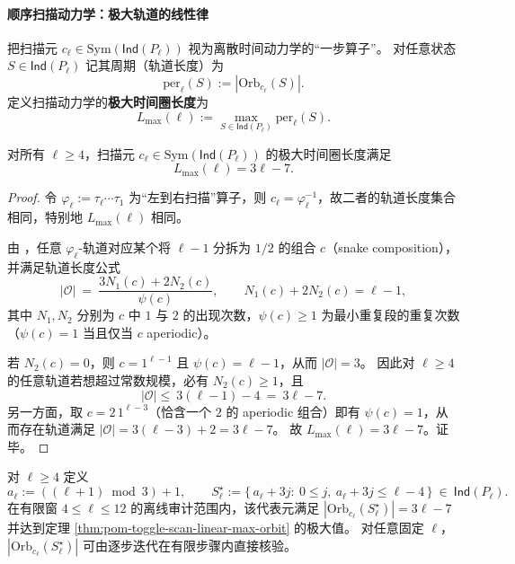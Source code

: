 \paragraph{顺序扫描动力学：极大轨道的线性律}

\begin{definition}[极大时间圈长度]\label{def:pom-toggle-scan-max-orbit}
把扫描元 \(c_\ell\in\mathrm{Sym}(\mathsf{Ind}(P_\ell))\) 视为离散时间动力学的“一步算子”。
对任意状态 \(S\in\mathsf{Ind}(P_\ell)\) 记其周期（轨道长度）为
\[
\mathrm{per}_\ell(S):=|\mathrm{Orb}_{c_\ell}(S)|.
\]
定义扫描动力学的\textbf{极大时间圈长度}为
\[
L_{\max}(\ell):=\max_{S\in\mathsf{Ind}(P_\ell)} \mathrm{per}_\ell(S).
\]
\end{definition}

\begin{theorem}\label{thm:pom-toggle-scan-linear-max-orbit}
对所有 \(\ell\ge 4\)，扫描元 \(c_\ell\in\mathrm{Sym}(\mathsf{Ind}(P_\ell))\) 的极大时间圈长度满足
\[
L_{\max}(\ell)=3\ell-7.
\]
\end{theorem}
\begin{proof}
令 \(\varphi_\ell:=\tau_\ell\cdots\tau_1\) 为“左到右扫描”算子，则 \(c_\ell=\varphi_\ell^{-1}\)，故二者的轨道长度集合相同，特别地 \(L_{\max}(\ell)\) 相同。

由 \cite[Def.~4.1 \& Prop.~4.3]{JosephRoby2018TogglingIndependentSetsPath}，任意 \(\varphi_\ell\)-轨道对应某个将 \(\ell-1\) 分拆为 \(1/2\) 的组合 \(c\)（snake composition），并满足轨道长度公式
\[
|\mathcal O|
\ =\
\frac{3N_1(c)+2N_2(c)}{\psi(c)},
\qquad
N_1(c)+2N_2(c)=\ell-1,
\]
其中 \(N_1,N_2\) 分别为 \(c\) 中 \(1\) 与 \(2\) 的出现次数，\(\psi(c)\ge 1\) 为最小重复段的重复次数（\(\psi(c)=1\) 当且仅当 \(c\) aperiodic）。

若 \(N_2(c)=0\)，则 \(c=1^{\ell-1}\) 且 \(\psi(c)=\ell-1\)，从而 \(|\mathcal O|=3\)。
因此对 \(\ell\ge 4\) 的任意轨道若想超过常数规模，必有 \(N_2(c)\ge 1\)，且
\[
|\mathcal O|
\le\
3(\ell-1)-4
\ =\
3\ell-7.
\]
另一方面，取 \(c=2\,1^{\ell-3}\)（恰含一个 \(2\) 的 aperiodic 组合）即有 \(\psi(c)=1\)，从而存在轨道满足
\(
|\mathcal O|=3(\ell-3)+2=3\ell-7
\)。
故 \(L_{\max}(\ell)=3\ell-7\)。证毕。
\end{proof}

\begin{remark}\label{rem:pom-toggle-scan-explicit-long-orbit}
对 \(\ell\ge 4\) 定义
\[
a_\ell:=((\ell+1)\bmod 3)+1,
\qquad
S_\ell^\star:=\{\,a_\ell+3j:\ 0\le j,\ a_\ell+3j\le \ell-4\,\}\ \in\ \mathsf{Ind}(P_\ell).
\]
在有限窗 \(4\le \ell\le 12\) 的离线审计范围内，该代表元满足
\(
|\mathrm{Orb}_{c_\ell}(S_\ell^\star)|=3\ell-7
\)
并达到定理 \ref{thm:pom-toggle-scan-linear-max-orbit} 的极大值。
对任意固定 \(\ell\)，\(|\mathrm{Orb}_{c_\ell}(S_\ell^\star)|\) 可由逐步迭代在有限步骤内直接核验。
\end{remark}

